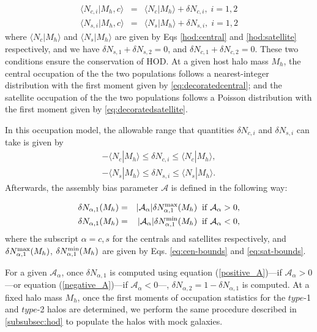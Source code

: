 \begin{eqnarray}
\langle N_{c,i} | M_{h},c\rangle &=& \langle N_{c} | M_{h}\rangle + \delta N _{c,i}, \; i=1,2 \label{eq:decoratedcentral} \\
\langle N_{s,i} | M_{h},c\rangle &=& \langle N_{s} | M_{h}\rangle + \delta N _{s,i}, \; i=1,2 \label{eq:decoratedsatellite}
\end{eqnarray}
where $\langle N_{c} | M_{h}\rangle$ and $\langle N_{s} | M_{h}\rangle$ are given by Eqs \ref{hod:central} and \ref{hod:satellite} respectively, and we have $\delta N_{s,1} + \delta N_{s,2} = 0$, and $\delta N_{c,1} + \delta N_{c,2} = 0$. These two conditions ensure the conservation of HOD. At a given host halo mass $M_{h}$, the central occupation of the the two populations follows a nearest-integer distribution with the first moment given by \ref{eq:decoratedcentral}; and the satellite occupation of the the two populations follows a Poisson distribution with the first moment given by \ref{eq:decoratedsatellite}.

In this occupation model, the allowable range that quantities $\delta N_{c,i}$ and $\delta N_{s,i}$ can take is given by 
\begin{eqnarray}
-\langle N_{c} | M_{h}\rangle \leq \delta N_{c,i} \leq \langle N_{c} | M_{h}\rangle
 , \label{eq:cen-bounds} \\
-\langle N_{s} | M_{h}\rangle \leq \delta N_{s,i} \leq \langle N_{s} | M_{h}\rangle. \label{eq:sat-bounds}
\end{eqnarray}
Afterwards, the assembly bias parameter $\mathcal{A}$ is defined in the following way:

\begin{eqnarray}
\delta N_{\alpha , 1}(M_{h}) &=& |\mathcal{A_\alpha}| \delta N_{\alpha , 1}^{\rm max}(M_{h}) \; \; \rm{if} \; \mathcal{A_\alpha} > 0,  \label{positive_A} \\
\delta N_{\alpha , 1}(M_{h}) &=& |\mathcal{A_\alpha}| \delta N_{\alpha , 1}^{\rm min}(M_{h}) \; \; \rm{if} \; \mathcal{A_\alpha} < 0, \label{negative_A}
\end{eqnarray}
where the subscript $\alpha = c , s$ for the centrals and satellites respectively, and $\delta N_{\alpha , 1}^{\rm max}(M_{h})$, $\delta N_{\alpha , 1}^{\rm min}(M_{h})$ are given by Eqs. \ref{eq:cen-bounds} and \ref{eq:sat-bounds}. 

For a given $\mathcal{A}_{\alpha}$, once $\delta N_{\alpha,1}$ is computed using equation (\ref{positive_A})---if $\mathcal{A}_{\alpha}>0$---or equation (\ref{negative_A})---if $\mathcal{A}_{\alpha}<0$---, $\delta N_{\alpha,2} = 1 - \delta N_{\alpha,1}$ is computed. At a fixed halo mass $M_{h}$, once the first moments of occupation statistics for the $type$-1 and $type$-2 halos are determined, we perform the same procedure described in \ref{subsubsec:hod} to populate the halos with mock galaxies.

